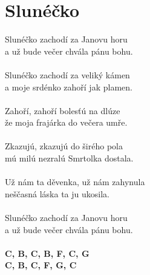 \section{Slunéčko}
Slunéčko zachodí za Janovu horu\\
a už bude večer chvála pánu bohu.\\
\\
Slunéčko zachodí za veliký kámen\\
a moje srdénko zahoří jak plamen.\\
\\
Zahoří, zahoří bolesťú na dlúze\\
že moja frajárka do večera umře.\\
\\
Zkazujú, zkazujú do širého pola\\
mú milú nezralú Smrtolka dostala.\\
\\
Už nám ta děvenka, už nám zahynula\\
neščasná láska ta ju ukosila.\\
\\
Slunéčko zachodí za Janovu horu\\
a už bude večer chvála pánu bohu.\\
\\
\footnotesize\textbf{C, B\be, C, B\be, F, C, G}\\
\textbf{C, B\be, C, F, G, C}
\normalsize